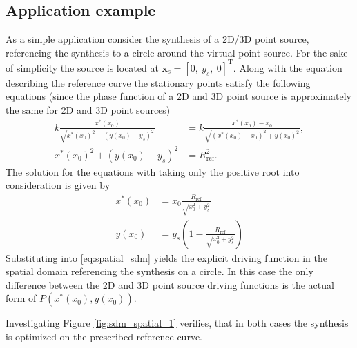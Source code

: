 \documentclass[12pt,a4paper]{article}
\newcommand{\vxs}{\mathbf{x}_{\mathrm{s}}}
\begin{document}
\subsection{Application example}
As a simple application consider the synthesis of a 2D/3D point source, referencing the synthesis to a circle around the virtual point source.
For the sake of simplicity the source is located at $\vxs = [0,\ y_s,\ 0]^{\mathrm{T}}$. Along with the equation describing the reference curve the stationary points satisfy the following equations (since the phase function of a 2D and 3D point source is approximately the same for 2D and 3D point sources)
\begin{align}
k \frac{x^*(x_0)}{\sqrt{x^*(x_0)^2 + (y(x_0)-y_s)^2}} &= k \frac{x^*(x_0)-x_0}{\sqrt{(x^*(x_0)-x_0)^2 + y(x_0)^2}}, \\
x^*(x_0)^2 + (y(x_0)-y_s)^2     &= R_{\mathrm{ref}}^2.
\end{align}
The solution for the equations with taking only the positive root into consideration is given by
\begin{align}
x^*(x_0) &= x_0 \frac{ R_{\mathrm{ref}}}{\sqrt{x_0^2 + y_s^2}} \\
y(x_0) 	 &= y_s \left( 1 -  \frac{R_{\mathrm{ref}}}{\sqrt{x_0^2 + y_s^2}}\right)
\end{align}
Substituting into \eqref{eq:spatial_sdm} yields the explicit driving function in the spatial domain referencing the synthesis on a circle.
In this case the only difference between the 2D and 3D point source driving functions is the actual form of $P(x^*(x_0),y(x_0))$.

Investigating Figure \ref{fig:sdm_spatial_1} verifies, that in both cases the synthesis is optimized on the prescribed reference curve.
\end{document}
